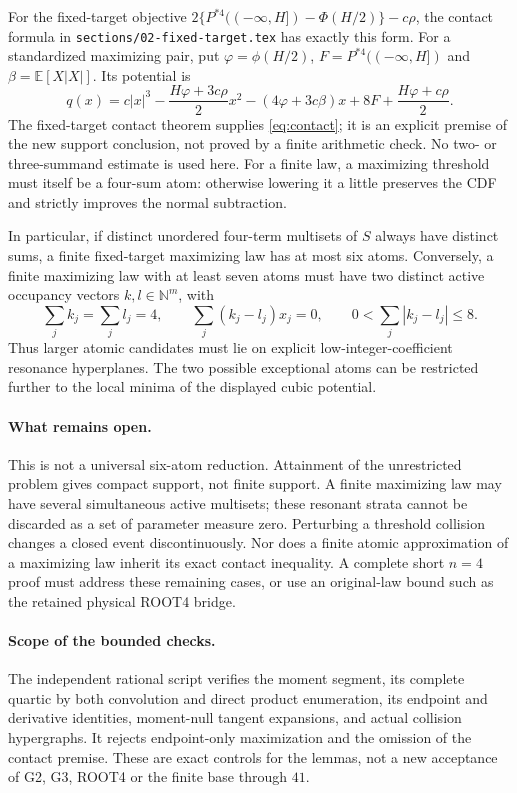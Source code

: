 \documentclass[11pt,a4paper]{article}
\newcommand{\E}{\mathbb E}\newcommand{\Pp}{\mathbb P}
\begin{document}
For the fixed-target objective
$2\{P^{*4}(( -\infty,H])-\Phi(H/2)\}-c\rho$, the contact formula
in \texttt{sections/02-fixed-target.tex} has exactly this form.
For a standardized maximizing pair, put
$\varphi=\phi(H/2)$, $F=P^{*4}(( -\infty,H])$ and
$\beta=\E[X|X|]$. Its potential is
\[
 q(x)=c|x|^3-\frac{H\varphi+3c\rho}{2}x^2
              -(4\varphi+3c\beta)x
              +8F+\frac{H\varphi+c\rho}{2}.
\]
The fixed-target contact theorem supplies \eqref{eq:contact}; it is an
explicit premise of the new support conclusion, not proved by a finite
arithmetic check. No two- or three-summand estimate is used here.
For a finite law, a maximizing threshold must itself be a four-sum atom:
otherwise lowering it a little preserves the CDF and strictly improves
the normal subtraction.

In particular, if distinct unordered four-term multisets of $S$ always
have distinct sums, a finite fixed-target maximizing law has at most six
atoms. Conversely, a finite maximizing law with at least seven atoms must
have two distinct active occupancy vectors $k,l\in\mathbb N^m$, with
\[
 \sum_jk_j=\sum_jl_j=4,\qquad
 \sum_j(k_j-l_j)x_j=0,\qquad
 0<\sum_j|k_j-l_j|\le8.
\]
Thus larger atomic candidates must lie on explicit low-integer-coefficient
resonance hyperplanes. The two possible exceptional atoms can be restricted
further to the local minima of the displayed cubic potential.

\paragraph{What remains open.}
This is not a universal six-atom reduction. Attainment of the unrestricted
problem gives compact support, not finite support. A finite maximizing law
may have several simultaneous active multisets; these resonant strata
cannot be discarded as a set of parameter measure zero. Perturbing a
threshold collision changes a closed event discontinuously. Nor does a
finite atomic approximation of a maximizing law inherit its exact contact
inequality. A complete short $n=4$ proof must address these remaining cases,
or use an original-law bound such as the retained physical ROOT4 bridge.

\paragraph{Scope of the bounded checks.}
The independent rational script verifies the moment segment, its complete
quartic by both convolution and direct product enumeration, its endpoint
and derivative identities, moment-null tangent expansions, and actual
collision hypergraphs. It rejects endpoint-only maximization and the
omission of the contact premise. These are exact controls for the lemmas,
not a new acceptance of G2, G3, ROOT4 or the finite base through $41$.
\end{document}
